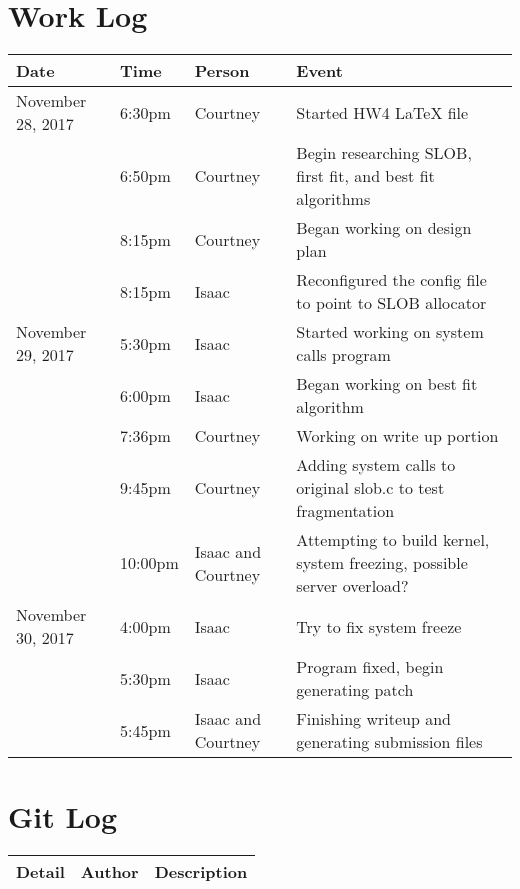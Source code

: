 \documentclass[letterpaper,10pt,draftclsnofoot,onecolumn,titlepage]{IEEEtran}
\begin{document}
\section{Work Log}
\begin{center}
\begin{tabular}{p{3cm}p{1cm}p{1cm}p{10cm} }
 Date  & Time & Person & Event \\ \hline
November 28, 2017 & 6:30pm & Courtney & Started HW4 LaTeX file \\
		  & 6:50pm & Courtney & Begin researching SLOB, first fit, and best fit algorithms \\
		  & 8:15pm & Courtney & Began working on design plan \\
		  & 8:15pm & Isaac & Reconfigured the config file to point to SLOB allocator \\
November 29, 2017 & 5:30pm & Isaac & Started working on system calls program \\
		  & 6:00pm & Isaac & Began working on best fit algorithm \\
		  & 7:36pm & Courtney & Working on write up portion\\
		  & 9:45pm & Courtney & Adding system calls to original slob.c to test fragmentation \\
		  & 10:00pm & Isaac and Courtney & Attempting to build kernel, system freezing, possible server overload? \\
November 30, 2017 & 4:00pm & Isaac & Try to fix system freeze \\
   		  & 5:30pm & Isaac & Program fixed, begin generating patch \\
   		  & 5:45pm & Isaac and Courtney & Finishing writeup and generating submission files \\
\end{tabular}
\end{center}

\section{Git Log}
\begin{tabular}{p{2cm} p{2cm} p{10cm}}\textbf{Detail} & \textbf{Author} & \textbf{Description}\\\hline
\end{tabular}
\end{document}
